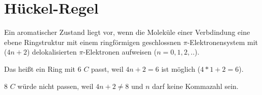 \section{Hückel-Regel}
Ein aromatischer Zustand liegt vor, 
wenn die Moleküle einer Verbdindung eine ebene Ringstruktur mit einem ringförmigen geschlossnen 
$\pi$-Elektronensystem mit ($4n + 2$) delokalisierten $\pi$-Elektronen aufweisen 
($n = 0,1,2,..$).

Das heißt ein Ring mit $6$ $C$ passt, weil $4n + 2 = 6$ ist möglich ($4*1+2 = 6$).

$8$ $C$ würde nicht passen, weil $4n + 2 \neq 8$ und $n$ darf keine Kommazahl sein.

